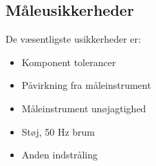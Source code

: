 \subsection*{Måleusikkerheder}
\label{maalejournal_maaleusikkerheder}
De væsentligste usikkerheder er:
\begin{itemize}
\item Komponent tolerancer
\item Påvirkning fra måleinstrument
\item Måleinstrument unøjagtighed
\item Støj, 50 Hz brum
\item Anden indstråling
\end{itemize}

%